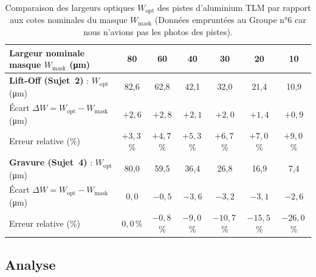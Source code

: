 \begin{table}[H]
  \centering\footnotesize
  \setlength{\tabcolsep}{4pt}
  \caption{Comparaison des largeurs optiques $W_{\text{opt}}$ des pistes d'aluminium TLM par rapport aux cotes nominales du masque $W_{\text{mask}}$ (Données empruntées au Groupe n°6 car nous n'avions pas les photos des pistes).}
  \label{tab:s3-tlm}
  \begin{tabularx}{\linewidth}{@{}X c c c c c c@{}}
    \toprule
    \textbf{Largeur nominale masque $W_{\text{mask}}$ (\unit{\micro\metre})} & \textbf{80} & \textbf{60} & \textbf{40} & \textbf{30} & \textbf{20} & \textbf{10} \\
    \midrule
    \textbf{Lift-Off (Sujet~2)} : $W_{\text{opt}}$ (\unit{\micro\metre}) & 82,6 & 62,8 & 42,1 & 32,0 & 21,4 & 10,9 \\
    \quad Écart $\Delta W = W_{\text{opt}} - W_{\text{mask}}$ (\unit{\micro\metre}) & $+2{,}6$ & $+2{,}8$ & $+2{,}1$ & $+2{,}0$ & $+1{,}4$ & $+0{,}9$ \\
    \quad Erreur relative (\%) & $+3{,}3$\,\% & $+4{,}7$\,\% & $+5{,}3$\,\% & $+6{,}7$\,\% & $+7{,}0$\,\% & $+9{,}0$\,\% \\
    \addlinespace[3pt]
    \textbf{Gravure (Sujet~4)} : $W_{\text{opt}}$ (\unit{\micro\metre}) & 80,0 & 59,5 & 36,4 & 26,8 & 16,9 & 7,4 \\
    \quad Écart $\Delta W = W_{\text{opt}} - W_{\text{mask}}$ (\unit{\micro\metre}) & $0{,}0$ & $-0{,}5$ & $-3{,}6$ & $-3{,}2$ & $-3{,}1$ & $-2{,}6$ \\
    \quad Erreur relative (\%) & $0{,}0$\,\% & $-0{,}8$\,\% & $-9{,}0$\,\% & $-10{,}7$\,\% & $-15{,}5$\,\% & $-26{,}0$\,\% \\
    \bottomrule
  \end{tabularx}
\end{table}

\FloatBarrier
\subsection{Analyse}

